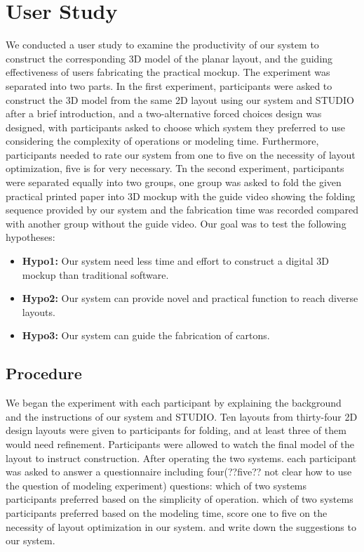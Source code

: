 \section{User Study}
We conducted a user study to examine the productivity of our system to construct the corresponding 3D model of the planar layout, and the guiding effectiveness of users fabricating the practical mockup. The experiment was separated into two parts. In the first experiment, participants were asked to construct the 3D model from the same 2D layout using our system and STUDIO after a brief introduction, and a two-alternative forced choices design was designed, with participants asked to choose which system they preferred to use considering the complexity of operations or modeling time. Furthermore, participants needed to rate our system from one to five on the necessity of layout optimization, five is for very necessary. Tn the second experiment, participants were separated equally into two groups, one group was asked to fold the given practical printed paper into 3D mockup with the guide video showing the folding sequence provided by our system and the fabrication time was recorded compared with another group without the guide video. Our goal was to test the following hypotheses:

\begin{itemize}
	\item \textbf{Hypo1:} Our system need less time and effort to construct a digital 3D mockup than traditional software.
	\item \textbf{Hypo2:} Our system can provide novel and practical function to reach diverse layouts.
	\item \textbf{Hypo3:} Our system can guide the fabrication of cartons.
\end{itemize}

\subsection{Procedure}
We began the experiment with each participant by explaining the background and the instructions of our system and STUDIO. Ten layouts from thirty-four 2D design layouts were given to participants for folding, and at least three of them would need refinement. Participants were allowed to watch the final model of the layout to instruct construction. After operating the two systems. each participant was asked to answer a questionnaire including four(??five?? not clear how to use the question of modeling experiment) questions: which of two systems participants preferred based on the simplicity of operation. which of two systems participants preferred based on the modeling time, score one to five on the necessity of layout optimization in our system. and write down the suggestions to our system.

